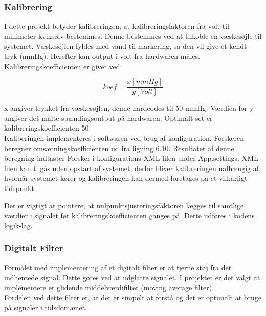 \subsubsection{Kalibrering}
I dette projekt betyder kalibreringen, at kalibreringsfaktoren fra volt til millimeter kviksølv bestemmes. Denne bestemmes ved at tilkoble en væskesøjle til systemet. Væskesøjlen fyldes med vand til markering, så den vil give et kendt tryk (mmHg). Herefter kan output i volt fra hardwaren måles. Kalibreringskoefficienten er givet ved:
\begin{ceqn}
\begin{equation}
koef=\dfrac{x [mmHg]}{y [Volt]}
\end{equation}
\end{ceqn}
x angiver trykket fra væskesøjlen, denne hardcodes til 50 mmHg. Værdien for y angiver det målte spændingsoutput på hardwaren. Optimalt set er kalibreringskoefficienten 50.\\ 
Kaliberingen implementeres i softwaren ved brug af konfiguration. Forskeren beregner omsætningskoefficienten ud fra ligning 6.10. Resultatet af denne beregning indtaster Forsker i konfigurations XML-filen under App.settings. XML-filen kan tilgås uden opstart af systemet, derfor bliver kalibreringen uafhængig af, hvornår systemet kører og kalibreringen kan dermed foretages på et vilkårligt tidspunkt.

Det er vigtigt at pointere, at nulpunktsjusteringsfaktoren lægges til samtlige værdier i signalet før kalibreringskoefficienten ganges på. Dette udføres i kodens logik-lag.

\subsubsection{Digitalt Filter}
\cite{DSBsoft} Formålet med implementering af et digitalt filter er at fjerne støj fra det indhentede signal. Dette gøres ved at udglatte signalet. I projektet er det valgt at implementere et glidende middelværdifilter (moving average filter).\\ Fordelen ved dette filter er, at det er simpelt at forstå og det er optimalt at bruge på signaler i tidsdomænet.


